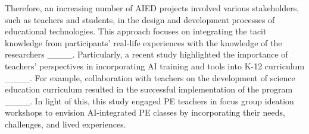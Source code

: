 Therefore, an increasing number of AIED projects involved various stakeholders, such as teachers and students, in the design and development processes of educational technologies. This approach focuses on integrating the tacit knowledge from participants' real-life experiences with the knowledge of the researchers ____. Particularly, a recent study highlighted the importance of teachers' perspectives in incorporating AI training and tools into K-12 curriculum ____. For example, collaboration with teachers on the development of science education curriculum resulted in the successful implementation of the program ____. In light of this, this study engaged PE teachers in focus group ideation workshops to envision AI-integrated PE classes by incorporating their needs, challenges, and lived experiences.



